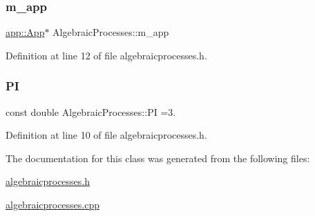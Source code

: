 \subsubsection{\texorpdfstring{m\+\_\+app}{m\_app}}
{\footnotesize\ttfamily \mbox{\hyperlink{classapp_1_1_app}{app\+::\+App}}$\ast$ Algebraic\+Processes\+::m\+\_\+app\hspace{0.3cm}{\ttfamily [private]}}



Definition at line 12 of file algebraicprocesses.\+h.

\mbox{\label{class_algebraic_processes_abc06b36148d57f4ef59f24620f13a138}} 
\subsubsection{\texorpdfstring{PI}{PI}}
{\footnotesize\ttfamily const double Algebraic\+Processes\+::\+PI =3.\hspace{0.3cm}{\ttfamily [private]}}



Definition at line 10 of file algebraicprocesses.\+h.



The documentation for this class was generated from the following files\+:\begin{DoxyCompactItemize}
\item 
\mbox{\hyperlink{algebraicprocesses_8h}{algebraicprocesses.\+h}}\item 
\mbox{\hyperlink{algebraicprocesses_8cpp}{algebraicprocesses.\+cpp}}\end{DoxyCompactItemize}
